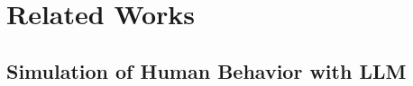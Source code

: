 \documentclass[11pt]{article}
\DeclareRobustCommand{\note}[1]{{\sethlcolor{orange!30!white}\hl{#1}}}
\begin{document}




\section{Related Works}
\subsection{Simulation of Human Behavior with LLM }
\end{document}

